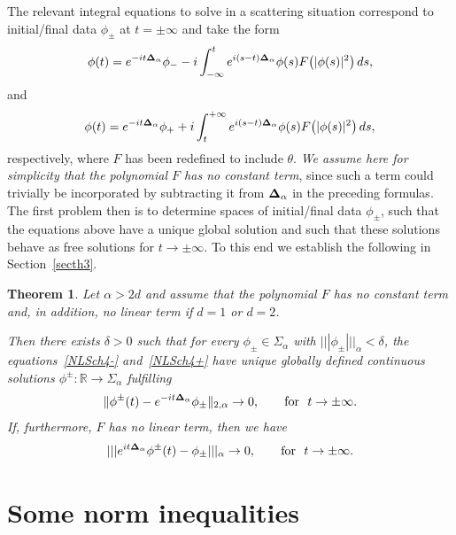 \documentclass[11pt]{article}
\newtheorem{theorem}{Theorem}
\begin{document}
The relevant integral equations to solve in a scattering situation
correspond to initial/f\/inal data $\phi_\pm$ at $t=\pm\infty$ and
take the form
\begin{gather}
\label{NLSch4-}
\phi(t)=e^{-it{{\bf\Delta}_\alpha}}\phi_--i\int_{-\infty}^t
e^{i{(s-t){\bf\Delta}_\alpha}}\phi(s) F\big(|\phi(s)|^2\big)\,ds ,
\end{gather}
and
\begin{gather}
\label{NLSch4+}
\phi(t)=e^{-it{{\bf\Delta}_\alpha}}\phi_++i\int^{+\infty}_t
e^{i{(s-t){\bf\Delta}_\alpha}}\phi(s) F\big(|\phi(s)|^2\big)\,ds ,
\end{gather}
respectively, where $F$ has been redef\/ined to include $\theta$.
 {\it We assume here for simplicity that the polynomial $F$
has no constant term}, since such a term could trivially be incorporated by
subtracting it from ${\bf\Delta}_\alpha$ in the preceding formulas.   The
f\/irst problem
then is to determine spaces of initial/f\/inal data $\phi_\pm$, such that the
equations above have a unique global solution and such that these
solutions behave as free solutions for $t\to \pm\infty$.
To this end we establish the following in Section~\ref{secth3}.

\begin{theorem}\label{th3}
Let $\alpha>2d$ and assume that the polynomial $F$ has no constant
term and, in addition, no linear term
if $d=1$ or $d=2$.

Then there exists $\delta>0$ such that for every
 $\phi_\pm\in\Sigma_{\alpha}$ with $|||\phi_\pm|||_{\alpha}<\delta$, the
equations~\eqref{NLSch4-} and~\eqref{NLSch4+} have unique globally
defined continuous solutions $\phi^\pm:\mathbb R\to \Sigma_{\alpha}$ fulfilling
\begin{gather}\label{solsmall1}
\Vert\phi^\pm(t)- e^{-it{{\bf\Delta}_\alpha}}\phi_\pm\Vert_{2,\alpha}  \to
0,\qquad\mbox{for}\ \ t\to\pm\infty .
\end{gather}
If, furthermore, $F$ has no linear term, then we have
\begin{gather}\label{solsmall2}
 |||e^{it{{\bf\Delta}_\alpha}}\phi^\pm(t)- \phi_\pm |||_{\alpha}  \to
0,\qquad\mbox{for}\  \ t\to\pm\infty .
\end{gather}
\end{theorem}
\setcounter{section}{2}
\setcounter{subsection}{0}
\setcounter{subsubsection}{0}
\setcounter{equation}{17}
\section{Some norm inequalities}
\label{secframe}
\end{document}
